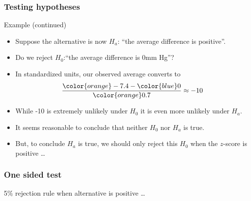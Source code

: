 \documentclass[handout]{beamer}
\begin{document}

   \begin{frame} \frametitle{Testing hypotheses}

   \begin{block}
   {Example (continued)}
   \begin{itemize}

   \item Suppose the alternative is now $H_a$: ``the average difference is positive''.
   \item Do we reject $H_0$:``the average difference is 0mm Hg''?

    \item In standardized units, our observed average converts to
    $$
    \frac{{\color{orange}-7.4} - {\color{blue} 0}}{\color{orange} 0.7} \approx -10
    $$

   \item While -10 is extremely unlikely under $H_0$ it is even more
   unlikely under $H_a$.

   \item It seems reasonable to conclude that neither $H_0$ nor
   $H_a$ is true.

   \item But, to conclude $H_a$ is true, we should only reject this $H_0$ when the $z$-score is positive \dots
   \end{itemize}
   \end{block}
   \end{frame}



   \begin{frame}
   \frametitle{One sided test}
   \begin{center}
   \end{center}
   {\color{blue} 5\% rejection rule} when alternative is positive \dots
   \end{frame}
\end{document}
